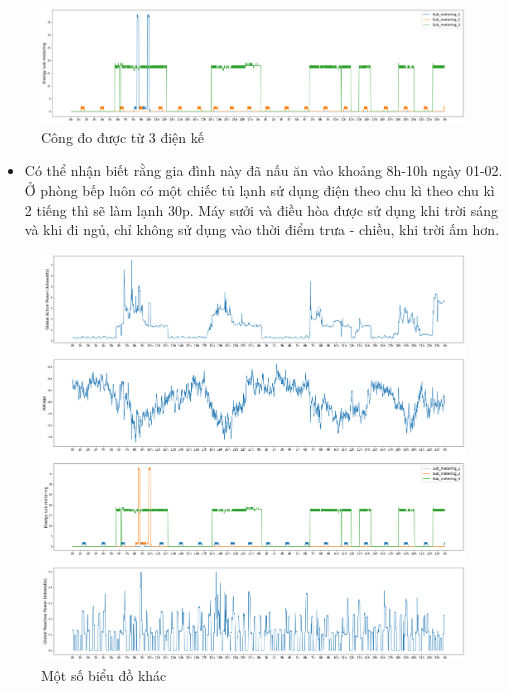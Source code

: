 \documentclass[a4paper, 12pt]{article}
\begin{document}
        \begin{figure}[H]
            \centering
            \includegraphics[scale=0.3]{img/meterings.png}
            \caption{Công đo được từ 3 điện kế}
        \end{figure}
        
        \begin{itemize}
            \item Có thể nhận biết rằng gia đình này đã nấu ăn vào khoảng 8h-10h ngày 01-02. Ở phòng bếp luôn có một chiếc tủ lạnh sử dụng điện theo chu kì theo chu kì 2 tiếng thì sẽ làm lạnh 30p. Máy sưởi và điều hòa được sử dụng khi trời sáng và khi đi ngủ, chỉ không sử dụng vào thời điểm trưa - chiều, khi trời ấm hơn.
        \end{itemize}
        
        \begin{figure}[H]
            \centering
            \includegraphics[scale=0.3]{img/all.png}
            \caption{Một số biểu đồ khác}
        \end{figure}
        
\end{document}
